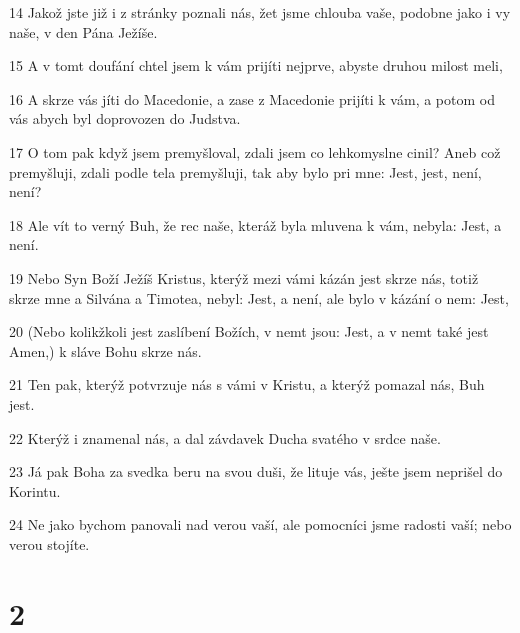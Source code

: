 \par 14 Jakož jste již i z stránky poznali nás, žet jsme chlouba vaše, podobne jako i vy naše, v den Pána Ježíše.
\par 15 A v tomt doufání chtel jsem k vám prijíti nejprve, abyste druhou milost meli,
\par 16 A skrze vás jíti do Macedonie, a zase z Macedonie prijíti k vám, a potom od vás abych byl doprovozen do Judstva.
\par 17 O tom pak když jsem premyšloval, zdali jsem co lehkomyslne cinil? Aneb což premyšluji, zdali podle tela premyšluji, tak aby bylo pri mne: Jest, jest, není, není?
\par 18 Ale vít to verný Buh, že rec naše, kteráž byla mluvena k vám, nebyla: Jest, a není.
\par 19 Nebo Syn Boží Ježíš Kristus, kterýž mezi vámi kázán jest skrze nás, totiž skrze mne a Silvána a Timotea, nebyl: Jest, a není, ale bylo v kázání o nem: Jest,
\par 20 (Nebo kolikžkoli jest zaslíbení Božích, v nemt jsou: Jest, a v nemt také jest Amen,) k sláve Bohu skrze nás.
\par 21 Ten pak, kterýž potvrzuje nás s vámi v Kristu, a kterýž pomazal nás, Buh jest.
\par 22 Kterýž i znamenal nás, a dal závdavek Ducha svatého v srdce naše.
\par 23 Já pak Boha za svedka beru na svou duši, že lituje vás, ješte jsem neprišel do Korintu.
\par 24 Ne jako bychom panovali nad verou vaší, ale pomocníci jsme radosti vaší; nebo verou stojíte.

\chapter{2}

